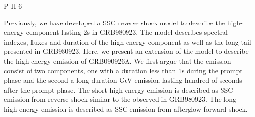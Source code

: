 P-II-6


\bigskip



\bigskip

\noindent Previously, we have developed a SSC reverse shock model to describe the high-energy component lasting 2s in GRB980923. The model describes spectral indexes, fluxes and duration of the high-energy component as well as the long tail presented in GRB980923. Here, we present an extension of the model to describe the high-energy emission of GRB090926A. We first argue that the emission consist of two components, one with a duration less than 1s during the prompt phase and the second a long duration GeV emission lasting hundred of seconds after the prompt phase. The short high-energy emission is described as SSC emission from reverse shock similar to the observed in GRB980923. The long high-energy emission is described as SSC emission from afterglow forward shock.
